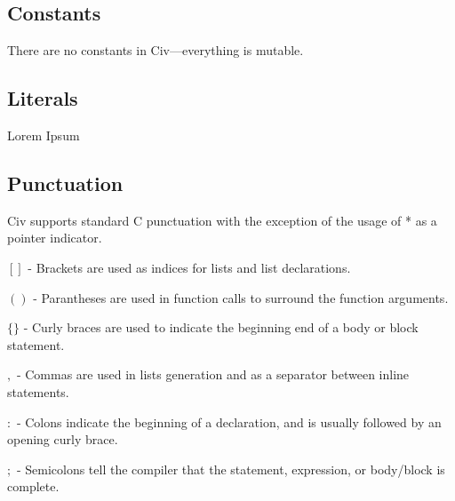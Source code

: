 \documentclass[a4paper]{article}
\begin{document}
\begin{multicols}{2}
\noindent 
{}
\end{multicols}


\subsection{Constants}

There are no constants in Civ—everything is mutable. 

\subsection{Literals}

Lorem Ipsum

\subsection{Punctuation}

Civ supports standard C punctuation with the exception of the usage of * as a pointer indicator.

\begin{description}
	\item{$[]$} - Brackets are used as indices for lists and list declarations.
	\item{$()$} - Parantheses are used in function calls to surround the function arguments.
    \item{$\{\}$} - Curly braces are used to indicate the beginning end of a body or block statement.
    \item{$,$} - Commas are used in lists generation and as a separator between inline statements.
    \item{$:$} - Colons indicate the beginning of a declaration, and is usually followed by an opening curly brace.
    \item{$;$} - Semicolons tell the compiler that the statement, expression, or body/block is complete.
\end{description}
\end{document}
